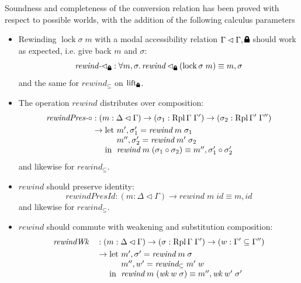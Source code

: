 \documentclass[12pt,twoside,openright]{report}
\numberwithin{equation}{chapter}
\numberwithin{figure}{chapter}
\numberwithin{table}{chapter}
\theoremstyle{definition}\newtheorem{definition}{Definition}
\newcommand{\lock}{\text{\tikz[baseline]{
      \fill[rounded corners=.1ex] (-.75ex,0) rectangle (.75ex,1ex);
      \draw[line width=.3ex] (-.4ex,.5ex) -- ++(0,.75ex) arc (180:0:.4ex) -- ++(0,-.75ex);
}}}
\begin{document}
Soundness and completeness of the conversion relation
has been proved with respect to possible worlds,
with the addition of the following calculus parameters
\begin{itemize}
\item Rewinding $\operatorname{lock} \sigma \; m$
  with a modal accessibility relation $\Gamma \lhd \Gamma, \lock$
  should work as expected, i.e. give back $m$ and $\sigma$:
  $$ \textit{rewind-$\lhd_\lock$} : \forall m, \sigma. \, \textit{rewind} \lhd_\lock (\operatorname{lock} \sigma \; m) \equiv m , \sigma $$
  and the same for $\textit{rewind}_\subseteq$ on $\operatorname{lift}_\lock$.
\item The operation $\textit{rewind}$ distributes over composition:
  \begin{align*}
    \textit{rewindPres-$\circ$} &: (m : \Delta\lhd\Gamma) \to (\sigma_1 : \operatorname{Rpl} \Gamma \; \Gamma') \to (\sigma_2 : \operatorname{Rpl} \Gamma' \; \Gamma'') \\
    &\to
    \begin{array}[t]{@{}l@{}l@{}}
      \text{let } & m' , \sigma_1' = \textit{rewind} \; m \; \sigma_1 \\
      & m'' , \sigma_2' = \textit{rewind} \; m' \; \sigma_2 \\
      \text{in } & \textit{rewind} \; m \; (\sigma_1 \circ \sigma_2) \equiv m'' , \sigma_1' \circ \sigma_2'
    \end{array}
  \end{align*}
  and likewise for $\textit{rewind}_\subseteq$.
\item $\textit{rewind}$ should preserve identity:
  $$ \textit{rewindPresId} : (m : \Delta\lhd\Gamma) \to \textit{rewind} \; m \; \textit{id} \equiv m , \textit{id} $$
  and likewise for $\textit{rewind}_\subseteq$.
\item $\textit{rewind}$ should commute with weakening and substitution composition:
  \begin{align*}
    &\textit{rewindWk} &&: (m : \Delta\lhd\Gamma) \to (\sigma : \operatorname{Rpl} \Gamma \; \Gamma') \to (w : \Gamma' \subseteq \Gamma'') \\
    &&&\to
    \begin{array}[t]{@{}l@{}l@{}}
      \text{let } & m' , \sigma' = \textit{rewind} \; m \; \sigma \\
      & m'' , w' = \textit{rewind}_\subseteq \; m' \; w \\
      \text{in } & \textit{rewind} \; m \; (\textit{wk} \; w \; \sigma) \equiv m'' , \textit{wk} \; w' \; \sigma'

\end{array}
\end{align*}
\end{itemize}
\end{document}
